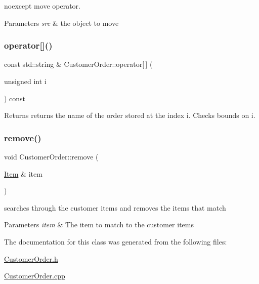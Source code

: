noexcept move operator. 
\begin{DoxyParams}{Parameters}
{\em src} & the object to move \\
\hline
\end{DoxyParams}
\mbox{\label{class_customer_order_a8ff1239910926e660ce7692807a7847d}} 
\subsubsection{\texorpdfstring{operator[]()}{operator[]()}}
{\footnotesize\ttfamily const std\+::string \& Customer\+Order\+::operator\mbox{[}$\,$\mbox{]} (\begin{DoxyParamCaption}\item[{unsigned int}]{i }\end{DoxyParamCaption}) const}

\begin{DoxyReturn}{Returns}
returns the name of the order stored at the index i. Checks bounds on i. 
\end{DoxyReturn}
\mbox{\label{class_customer_order_a8059d5a73bfa388f86671d45835468d6}} 
\subsubsection{\texorpdfstring{remove()}{remove()}}
{\footnotesize\ttfamily void Customer\+Order\+::remove (\begin{DoxyParamCaption}\item[{\mbox{\hyperlink{class_item}{Item}} \&}]{item }\end{DoxyParamCaption})}

searches through the customer items and removes the items that match 
\begin{DoxyParams}{Parameters}
{\em item} & The item to match to the customer items \\
\hline
\end{DoxyParams}


The documentation for this class was generated from the following files\+:\begin{DoxyCompactItemize}
\item 
\mbox{\hyperlink{_customer_order_8h}{Customer\+Order.\+h}}\item 
\mbox{\hyperlink{_customer_order_8cpp}{Customer\+Order.\+cpp}}\end{DoxyCompactItemize}
